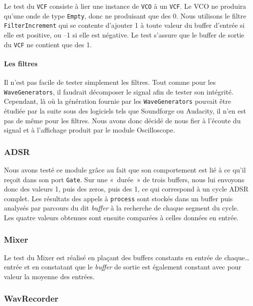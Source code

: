Le test du \verb!VCF! consiste à lier une instance de \verb!VCO! à
un \verb!VCF!. Le VCO ne produira qu'une onde de type \verb!Empty!,
donc ne produisant que des 0. Nous utilisons le filtre
\verb!FilterIncrement! qui se contente d'ajouter 1 à toute valeur
du buffer d'entrée si elle est positive, ou --1 si elle est
négative. Le test s'assure que le buffer de sortie du \verb!VCF! ne
contient que des 1.

\paragraph{Les filtres}

Il n'est pas facile de tester simplement les filtres. Tout comme
pour les \verb!WaveGenerators!, il faudrait décomposer le signal
afin de tester son intégrité. Cependant, là où la génération
fournie par les \verb!WaveGenerators! pouvait être étudiée par la
suite sous des logiciels tels que Soundforge ou Audacity, il n'en
est pas de même pour les filtres. Nous avons donc décidé de nous fier
à l'écoute du signal et à l’affichage produit par le module Oscilloscope.

\subsubsection{ADSR}

Nous avons testé ce module grâce au fait que son comportement est lié à ce qu'il reçoit dans son port \texttt{Gate}. Sur une «~durée~» de trois buffers, nous lui envoyons donc des valeurs 1, puis des zeros, puis des 1, ce qui correspond à un cycle ADSR complet. Les résultats des appels à \texttt{process} sont stockés dans un buffer puis analysés par parcours du dit \emph{buffer} à la recherche de chaque segment du cycle. Les quatre valeurs obtenues sont ensuite comparées à celles données en entrée.


\subsubsection{Mixer}

Le test du Mixer est réalisé en plaçant des buffers constants en entrée de chaque\dots entrée et en constatant que le \emph{buffer} de sortie est également constant avec pour valeur la moyenne des entrées.


\subsubsection{WavRecorder}

